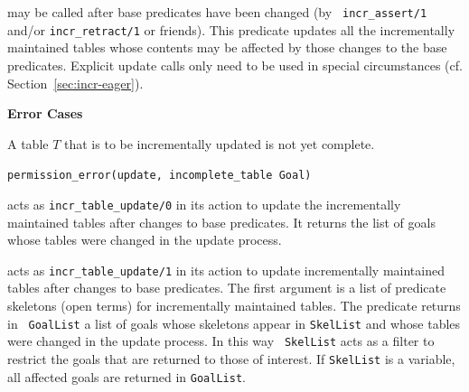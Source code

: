 \begin{description}
 may
be called after base predicates have been changed (by {\tt
  incr\_assert/1} and/or {\tt incr\_retract/1} or friends).  This
predicate updates all the incrementally maintained tables whose
contents may be affected by those changes to the base predicates.
Explicit update calls only need to be used in special circumstances
(cf. Section~\ref{sec:incr-eager}).

{\bf Error Cases}
\bi
\item A table $T$ that is to be incrementally updated is not yet
  complete.  
\bi
\item 	{\tt permission\_error(update, incomplete\_table Goal)}
\ei
\ei

acts as {\tt incr\_table\_update/0} in its action to update the
incrementally maintained tables after changes to base predicates.  It
returns the list of goals whose tables were changed in the update
process.

acts as {\tt incr\_table\_update/1} in its action to update
incrementally maintained tables after changes to base predicates.  The
first argument is a list of predicate skeletons (open terms) for
incrementally maintained tables.  The predicate returns in {\tt
  GoalList} a list of goals whose skeletons appear in {\tt SkelList}
and whose tables were changed in the update process.  In this way {\tt
  SkelList} acts as a filter to restrict the goals that are returned
to those of interest.  If {\tt SkelList} is a variable, all affected
goals are returned in {\tt GoalList}.


\end{description}

